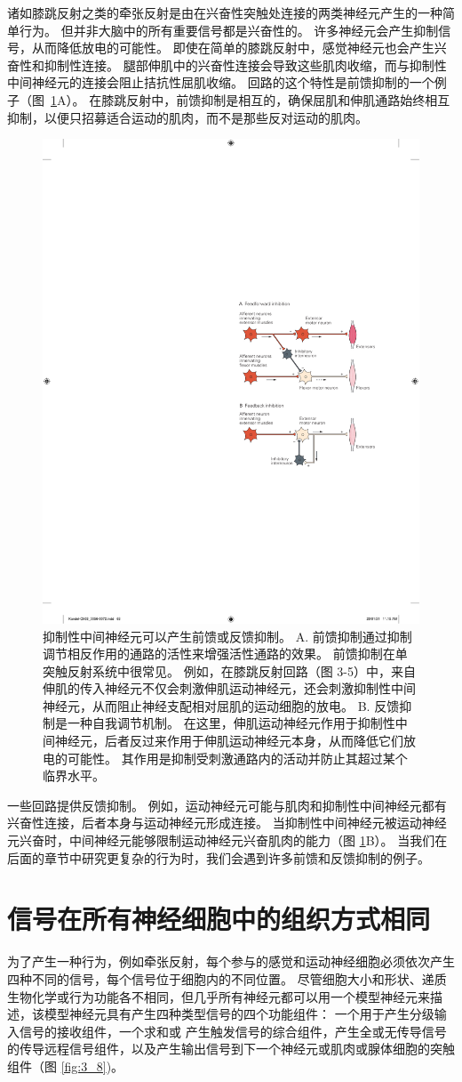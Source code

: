 诸如膝跳反射之类的牵张反射是由在兴奋性突触处连接的两类神经元产生的一种简单行为。 
但并非大脑中的所有重要信号都是兴奋性的。 
许多神经元会产生抑制信号，从而降低放电的可能性。 
即使在简单的膝跳反射中，感觉神经元也会产生兴奋性和抑制性连接。 
腿部伸肌中的兴奋性连接会导致这些肌肉收缩，而与抑制性中间神经元的连接会阻止拮抗性屈肌收缩。 
回路的这个特性是前馈抑制的一个例子（图~\ref{fig:3_7}A）。 
在膝跳反射中，前馈抑制是相互的，确保屈肌和伸肌通路始终相互抑制，以便只招募适合运动的肌肉，而不是那些反对运动的肌肉。

\begin{figure}[htbp]
	\centering
	\includegraphics[width=0.5\linewidth]{chap03/fig_3_7}
	\caption{抑制性中间神经元可以产生前馈或反馈抑制。 
		A. 前馈抑制通过抑制调节相反作用的通路的活性来增强活性通路的效果。 
		前馈抑制在单突触反射系统中很常见。 
		例如，在膝跳反射回路（图 3-5）中，来自伸肌的传入神经元不仅会刺激伸肌运动神经元，还会刺激抑制性中间神经元，从而阻止神经支配相对屈肌的运动细胞的放电。 
		B. 反馈抑制是一种自我调节机制。 
		在这里，伸肌运动神经元作用于抑制性中间神经元，后者反过来作用于伸肌运动神经元本身，从而降低它们放电的可能性。 
		其作用是抑制受刺激通路内的活动并防止其超过某个临界水平。}
	\label{fig:3_7}
\end{figure}


一些回路提供反馈抑制。 
例如，运动神经元可能与肌肉和抑制性中间神经元都有兴奋性连接，后者本身与运动神经元形成连接。 
当抑制性中间神经元被运动神经元兴奋时，中间神经元能够限制运动神经元兴奋肌肉的能力（图 \ref{fig:3_7}B）。 
当我们在后面的章节中研究更复杂的行为时，我们会遇到许多前馈和反馈抑制的例子。


\section{信号在所有神经细胞中的组织方式相同}
为了产生一种行为，例如牵张反射，每个参与的感觉和运动神经细胞必须依次产生四种不同的信号，每个信号位于细胞内的不同位置。 
尽管细胞大小和形状、递质生物化学或行为功能各不相同，但几乎所有神经元都可以用一个模型神经元来描述，该模型神经元具有产生四种类型信号的四个功能组件：
一个用于产生分级输入信号的接收组件，一个求和或 产生触发信号的综合组件，产生全或无传导信号的传导远程信号组件，以及产生输出信号到下一个神经元或肌肉或腺体细胞的突触组件（图 \ref{fig:3_8})。

